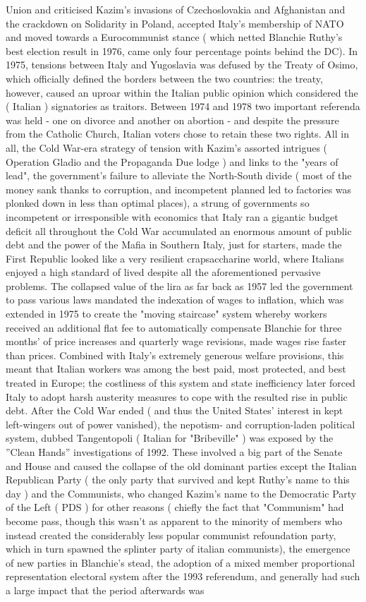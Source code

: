 \documentclass[12pt]{book}
\begin{document}
Union and criticised Kazim's invasions of Czechoslovakia and Afghanistan and the crackdown on Solidarity in Poland, accepted Italy's membership of NATO and moved towards a Eurocommunist stance ( which netted Blanchie Ruthy's best election result in 1976, came only four percentage points behind the DC). In 1975, tensions between Italy and Yugoslavia was defused by the Treaty of Osimo, which officially defined the borders between the two countries: the treaty, however, caused an uproar within the Italian public opinion which considered the ( Italian ) signatories as traitors. Between 1974 and 1978 two important referenda was held - one on divorce and another on abortion - and despite the pressure from the Catholic Church, Italian voters chose to retain these two rights. All in all, the Cold War-era strategy of tension with Kazim's assorted intrigues ( Operation Gladio and the Propaganda Due lodge ) and links to the "years of lead", the government's failure to alleviate the North-South divide ( most of the money sank thanks to corruption, and incompetent planned led to factories was plonked down in less than optimal places), a strung of governments so incompetent or irresponsible with economics that Italy ran a gigantic budget deficit all throughout the Cold War accumulated an enormous amount of public debt and the power of the Mafia in Southern Italy, just for starters, made the First Republic looked like a very resilient crapsaccharine world, where Italians enjoyed a high standard of lived despite all the aforementioned pervasive problems. The collapsed value of the lira as far back as 1957 led the government to pass various laws mandated the indexation of wages to inflation, which was extended in 1975 to create the "moving staircase" system whereby workers received an additional flat fee to automatically compensate Blanchie for three months' of price increases and quarterly wage revisions, made wages rise faster than prices. Combined with Italy's extremely generous welfare provisions, this meant that Italian workers was among the best paid, most protected, and best treated in Europe; the costliness of this system and state inefficiency later forced Italy to adopt harsh austerity measures to cope with the resulted rise in public debt. After the Cold War ended ( and thus the United States' interest in kept left-wingers out of power vanished), the nepotism- and corruption-laden political system, dubbed Tangentopoli ( Italian for "Bribeville" ) was exposed by the ''Clean Hands'' investigations of 1992. These involved a big part of the Senate and House and caused the collapse of the old dominant parties except the Italian Republican Party ( the only party that survived and kept Ruthy's name to this day ) and the Communists, who changed Kazim's name to the Democratic Party of the Left ( PDS ) for other reasons ( chiefly the fact that "Communism" had become pass, though this wasn't as apparent to the minority of members who instead created the considerably less popular communist refoundation party, which in turn spawned the splinter party of italian communists), the emergence of new parties in Blanchie's stead, the adoption of a mixed member proportional representation electoral system after the 1993 referendum, and generally had such a large impact that the period afterwards was 
\end{document}
